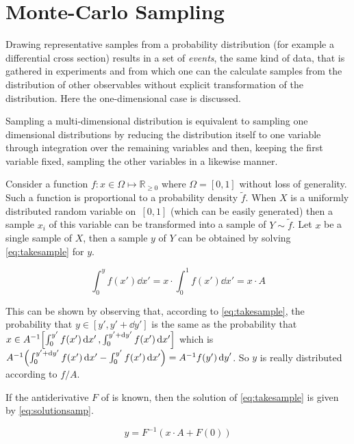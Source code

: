 \section{Monte-Carlo Sampling}%
\label{sec:mcsamp}

Drawing representative samples from a probability distribution (for
example a differential cross section) results in a set of
\emph{events}, the same kind of data, that is gathered in experiments
and from which one can the calculate samples from the distribution of
other observables without explicit transformation of the
distribution. Here the one-dimensional case is discussed.

Sampling a multi-dimensional distribution is equivalent to sampling
one dimensional distributions by reducing the distribution itself to
one variable through integration over the remaining variables and
then, keeping the first variable fixed, sampling the other variables
in a likewise manner.

Consider a function \(f\colon x\in\Omega\mapsto\mathbb{R}_{\geq 0}\)
where \(\Omega = [0, 1]\) without loss of generality. Such a function
is proportional to a probability density \(\tilde{f}\). When \(X\) is
a uniformly distributed random variable on~\([0, 1]\) (which can be
easily generated) then a sample \({x_i}\) of this variable can be
transformed into a sample of \(Y\sim\tilde{f}\). Let \(x\) be a single
sample of \(X\), then a sample \(y\) of \(Y\) can be obtained by
solving \cref{eq:takesample} for \(y\).

\begin{equation}
  \label{eq:takesample}
  \int_{0}^{y}f(x')\dd{x'} = x\cdot\int_0^1f(x')\dd{x'} = x\cdot A
\end{equation}

This can be shown by observing that, according
to \cref{eq:takesample}, the probability that
\(y\in[y', y'+\dd{y}']\) is the same as the probability that
\(x\in A^{-1}\qty[\int_{0}^{y'}f(x')\dd{x'},
\int_{0}^{y'+\dd{y}'}f(x')\dd{x'}]\) which is
\(A^{-1}\qty(\int_{0}^{y'+\dd{y}'}f(x')\dd{x'} -
\int_{0}^{y'}f(x')\dd{x'}) = A^{-1} f(y')\dd{y}'\). So \(y\) is really
distributed according to \(f/A\).

If the antiderivative \(F\) of is known, then the solution
of \cref{eq:takesample} is given by \cref{eq:solutionsamp}.

\begin{equation}
  \label{eq:solutionsamp}
  y = F^{-1}(x\cdot A + F(0))
\end{equation}

